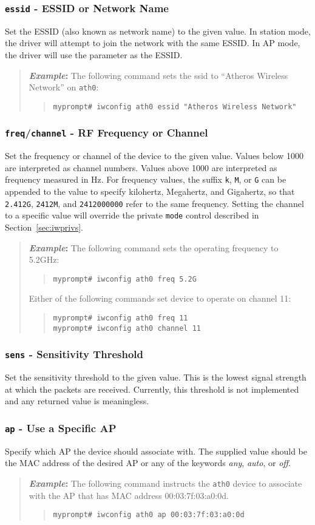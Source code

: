 \documentclass[10pt,fullpage]{article}
\newcommand{\mytt}[1]{{\texttt{#1}}}
\newcommand{\bv}{\begin{verse}}
\newcommand{\ev}{\end{verse}}
\newcommand{\cmd}[1]{{\texttt{myprompt\# #1}}}
\newcommand{\clival}[1]{{\emph{#1}}}
\newenvironment{example}{\begin{quote}\textbf{\textit{Example}:}}{\end{quote}}
\begin{document}
\subsubsection{\mytt{essid} - ESSID or Network Name}
Set the ESSID (also known as network name) to the given value.  In
station mode, the driver will attempt to join the network with the same
ESSID.  In AP mode, the driver will use the parameter as the ESSID.
\begin{example}
  The following command sets the ssid to ``Atheros Wireless
  Network'' on \mytt{ath0}:
  \bv
  \cmd{iwconfig ath0 essid "Atheros Wireless Network"}\\
  \ev
\end{example}

\subsubsection{\mytt{freq}/\mytt{channel} - RF Frequency or Channel}
Set the frequency or channel of the device to the given value.  Values
below 1000 are interpreted as channel numbers.  Values above 1000 are
interpreted as frequency measured in Hz.  For frequency values, the
suffix \mytt{k}, \mytt{M}, or \mytt{G} can be appended to the value to
specify kilohertz, Megahertz, and Gigahertz, so that \mytt{2.412G},
\mytt{2412M}, and \mytt{2412000000} refer to the same frequency. 
Setting the channel to a specific value will override the private
\mytt{mode} control described in Section~\ref{sec:iwprivs}.
\begin{example}
  The following command sets the operating frequency to 5.2GHz:
  \bv
  \cmd{iwconfig ath0 freq 5.2G}
  \ev
  Either of the following commands set device to operate on channel
  11:
  \bv
  \cmd{iwconfig ath0 freq 11}\\
  \cmd{iwconfig ath0 channel 11}
  \ev
\end{example}

\subsubsection{\mytt{sens} - Sensitivity Threshold}
Set the sensitivity threshold to the given value.  This is the lowest
signal strength at which the packets are received.  Currently, this
threshold is not implemented and any returned value is meaningless.

\subsubsection{\mytt{ap} - Use a Specific AP}
Specify which AP the device should associate with.  The supplied value
should be the MAC address of the desired AP or any of the keywords
\clival{any}, \clival{auto}, or \clival{off}.
\begin{example}
  The following command instructs the \mytt{ath0} device to associate
  with the AP that has MAC address 00:03:7f:03:a0:0d.
  \bv
  \cmd{iwconfig ath0 ap 00:03:7f:03:a0:0d}
  \ev
\end{example}
\end{document}

